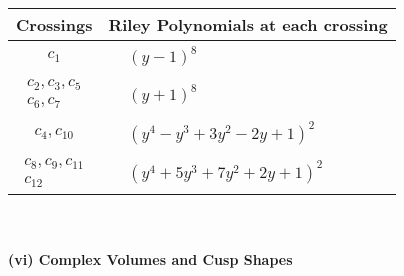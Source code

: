 \documentclass[1p]{elsarticle_modified}
\theoremstyle{definition}
\begin{document}
\begin{tabular}{m{50pt}|m{274pt}}
Crossings & \hspace{64pt}Riley Polynomials at each crossing \\
\hline $$\begin{aligned}c_{1}\end{aligned}$$&$\begin{aligned}
&(y-1)^8
\end{aligned}$\\
\hline $$\begin{aligned}c_{2},c_{3},c_{5}\\c_{6},c_{7}\end{aligned}$$&$\begin{aligned}
&(y+1)^8
\end{aligned}$\\
\hline $$\begin{aligned}c_{4},c_{10}\end{aligned}$$&$\begin{aligned}
&(y^4- y^3+3 y^2-2 y+1)^2
\end{aligned}$\\
\hline $$\begin{aligned}c_{8},c_{9},c_{11}\\c_{12}\end{aligned}$$&$\begin{aligned}
&(y^4+5 y^3+7 y^2+2 y+1)^2
\end{aligned}$\\
\hline
\end{tabular}\\~\\
\newpage\flushleft \textbf{(vi) Complex Volumes and Cusp Shapes}
\end{document}
